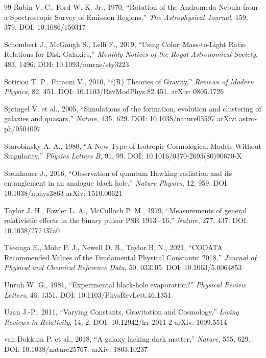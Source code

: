 \documentclass[10pt,a4paper]{article}
\begin{document}
\begin{thebibliography}{99}
Rubin V. C., Ford W. K. Jr., 1970, ``Rotation of the Andromeda Nebula from a Spectroscopic Survey of Emission Regions,'' \emph{The Astrophysical Journal}, 159, 379. DOI: 10.1086/150317

Schombert J., McGaugh S., Lelli F., 2019, ``Using Color--Mass-to-Light Ratio Relations for Disk Galaxies,'' \emph{Monthly Notices of the Royal Astronomical Society}, 483, 1496. DOI: 10.1093/mnras/sty3223

Sotiriou T. P., Faraoni V., 2010, ``f(R) Theories of Gravity,'' \emph{Reviews of Modern Physics}, 82, 451. DOI: 10.1103/RevModPhys.82.451. arXiv: 0805.1726

Springel V. et al., 2005, ``Simulations of the formation, evolution and clustering of galaxies and quasars,'' \emph{Nature}, 435, 629. DOI: 10.1038/nature03597 arXiv: astro-ph/0504097

Starobinsky A. A., 1980, ``A New Type of Isotropic Cosmological Models Without Singularity,'' \emph{Physics Letters B}, 91, 99. DOI: 10.1016/0370-2693(80)90670-X

Steinhauer J., 2016, ``Observation of quantum Hawking radiation and its entanglement in an analogue black hole,'' \emph{Nature Physics}, 12, 959. DOI: 10.1038/nphys3863 arXiv: 1510.00621

Taylor J. H., Fowler L. A., McCulloch P. M., 1979, ``Measurements of general relativistic effects in the binary pulsar PSR 1913+16,'' \emph{Nature}, 277, 437. DOI: 10.1038/277437a0

Tiesinga E., Mohr P. J., Newell D. B., Taylor B. N., 2021, ``CODATA Recommended Values of the Fundamental Physical Constants: 2018,'' \emph{Journal of Physical and Chemical Reference Data}, 50, 033105. DOI: 10.1063/5.0064853

Unruh W. G., 1981, ``Experimental black-hole evaporation?'' \emph{Physical Review Letters}, 46, 1351. DOI: 10.1103/PhysRevLett.46.1351

Uzan J.-P., 2011, ``Varying Constants, Gravitation and Cosmology,'' \emph{Living Reviews in Relativity}, 14, 2. DOI: 10.12942/lrr-2011-2 arXiv: 1009.5514

van Dokkum P. et al., 2018, ``A galaxy lacking dark matter,'' \emph{Nature}, 555, 629. DOI: 10.1038/nature25767. arXiv: 1803.10237


\end{thebibliography}
\end{document}
